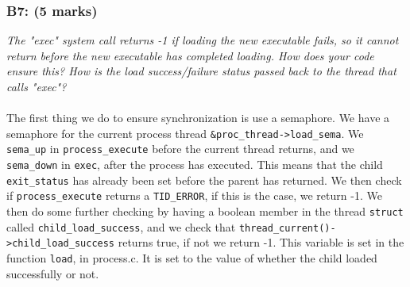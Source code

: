 \documentclass{article}
\begin{document}
\subsubsection*{B7: (5 marks) }
\textit{The "exec" system call returns -1 if loading the new executable fails, so it
cannot return before the new executable has completed loading. How does your
code ensure this? How is the load success/failure status passed back to the
thread that calls "exec"?}
\\ \\
The first thing we do to ensure synchronization is use a semaphore.
We have a semaphore for the current process thread \texttt{\&proc\_thread->load\_sema}.
We \texttt{sema\_up} in \texttt{process\_execute}  before the current thread returns, and we
\texttt{sema\_down} in \texttt{exec}, after the process has executed. This means that the
child \texttt{exit\_status} has already been set before the parent has returned.
We then check if \texttt{process\_execute} returns a \texttt{TID\_ERROR}, if this is the
case, we return -1.
We then do some further checking by having a boolean member in the thread \texttt{struct} called
\texttt{child\_load\_success}, and we check that \texttt{thread\_current()->child\_load\_success}
returns true, if not we return -1. This variable is set in the function \texttt{load},
in process.c. It is set to the value of whether the child loaded successfully
or not.
\end{document}
